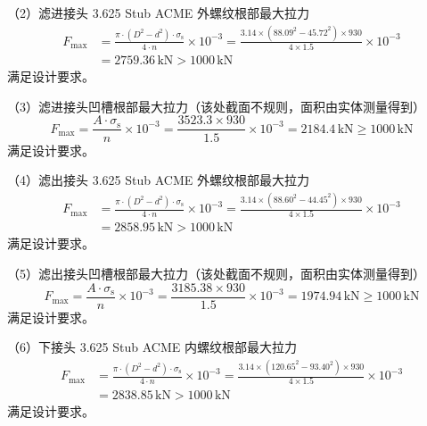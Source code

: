 （2）滤进接头 3.625 Stub ACME 外螺纹根部最大拉力
\begin{equation}
    \begin{aligned}
        F_{\max} &= \frac{\pi \cdot (D^2 - d^2) \cdot \sigma_\mathrm{s}}{4 \cdot n} \times 10^{-3} 
                = \frac{3.14 \times (88.09^2 - 45.72^2) \times 930}{4 \times 1.5} \times 10^{-3} \\
                &= 2759.36\,\text{kN} > 1000\,\text{kN}
    \end{aligned}
\end{equation}
满足设计要求。

（3）滤进接头凹槽根部最大拉力（该处截面不规则，面积由实体测量得到）
\begin{equation}
F_{\max} = \frac{A \cdot \sigma_{\mathrm{s}}}{n} \times 10^{-3} = \frac{3523.3 \times 930}{1.5} \times 10^{-3} = 2184.4\,\text{kN} \geq 1000\,\text{kN}
\end{equation}
满足设计要求。

（4）滤出接头 3.625 Stub ACME 外螺纹根部最大拉力
\begin{equation}
    \begin{aligned}
        F_{\max} &= \frac{\pi \cdot (D^2 - d^2) \cdot \sigma_\mathrm{s}}{4 \cdot n} \times 10^{-3} 
                = \frac{3.14 \times (88.60^2 - 44.45^2) \times 930}{4 \times 1.5} \times 10^{-3} \\
                &= 2858.95\,\text{kN} > 1000\,\text{kN}
    \end{aligned}
\end{equation}
满足设计要求。

（5）滤出接头凹槽根部最大拉力（该处截面不规则，面积由实体测量得到）
\begin{equation}
F_{\max} = \frac{A \cdot \sigma_{\mathrm{s}}}{n} \times 10^{-3} = \frac{3185.38 \times 930}{1.5} \times 10^{-3} = 1974.94\,\text{kN} \geq 1000\,\text{kN}
\end{equation}
满足设计要求。

（6）下接头 3.625 Stub ACME 内螺纹根部最大拉力
\begin{equation}
    \begin{aligned}
        F_{\max} &= \frac{\pi \cdot (D^2 - d^2) \cdot \sigma_{\mathrm{s}}}{4 \cdot n} \times 10^{-3}
                 = \frac{3.14 \times (120.65^2 - 93.40^2) \times 930}{4 \times 1.5} \times 10^{-3} \\
                 &= 2838.85\,\text{kN} > 1000\,\text{kN}
    \end{aligned}
\end{equation}
满足设计要求。


